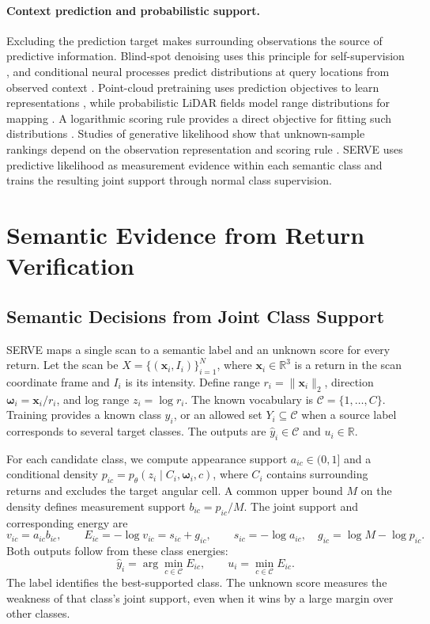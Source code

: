 \documentclass{article}
\newcommand{\R}{\mathbb{R}}
\begin{document}
\paragraph{Context prediction and probabilistic support.}
Excluding the prediction target makes surrounding observations the source of predictive information. Blind-spot denoising uses this principle for self-supervision \citep{noise2self,blindspot,pn2v}, and conditional neural processes predict distributions at query locations from observed context \citep{cnp,anp}. Point-cloud pretraining uses prediction objectives to learn representations \citep{pointmae,ponder,sonata}, while probabilistic LiDAR fields model range distributions for mapping \citep{plink}. A logarithmic scoring rule provides a direct objective for fitting such distributions \citep{proper}. Studies of generative likelihood show that unknown-sample rankings depend on the observation representation and scoring rule \citep{likelihood,perfectdensity}. SERVE uses predictive likelihood as measurement evidence within each semantic class and trains the resulting joint support through normal class supervision.

\section{Semantic Evidence from Return Verification}
\label{sec:method}
\subsection{Semantic Decisions from Joint Class Support}
\label{sec:joint}
SERVE maps a single scan to a semantic label and an unknown score for every return. Let the scan be $X=\{(\mathbf{x}_i,I_i)\}_{i=1}^{N}$, where $\mathbf{x}_i\in\R^3$ is a return in the scan coordinate frame and $I_i$ is its intensity. Define range $r_i=\|\mathbf{x}_i\|_2$, direction $\boldsymbol\omega_i=\mathbf{x}_i/r_i$, and log range $z_i=\log r_i$. The known vocabulary is $\mathcal C=\{1,\ldots,C\}$. Training provides a known class $y_i$, or an allowed set $Y_i\subseteq\mathcal C$ when a source label corresponds to several target classes. The outputs are $\hat y_i\in\mathcal C$ and $u_i\in\R$.

For each candidate class, we compute appearance support $a_{ic}\in(0,1]$ and a conditional density $p_{ic}=p_\theta(z_i\mid C_i,\boldsymbol\omega_i,c)$, where $C_i$ contains surrounding returns and excludes the target angular cell. A common upper bound $M$ on the density defines measurement support $b_{ic}=p_{ic}/M$. The joint support and corresponding energy are
\begin{equation}
 v_{ic}=a_{ic}b_{ic},\qquad
 E_{ic}=-\log v_{ic}=s_{ic}+g_{ic},\qquad
 s_{ic}=-\log a_{ic},\quad g_{ic}=\log M-\log p_{ic}.
 \label{eq:energy}
\end{equation}
Both outputs follow from these class energies:
\begin{equation}
 \hat y_i=\arg\min_{c\in\mathcal C} E_{ic},\qquad
 u_i=\min_{c\in\mathcal C} E_{ic}.
 \label{eq:outputs}
\end{equation}
The label identifies the best-supported class. The unknown score measures the weakness of that class's joint support, even when it wins by a large margin over other classes.
\end{document}
